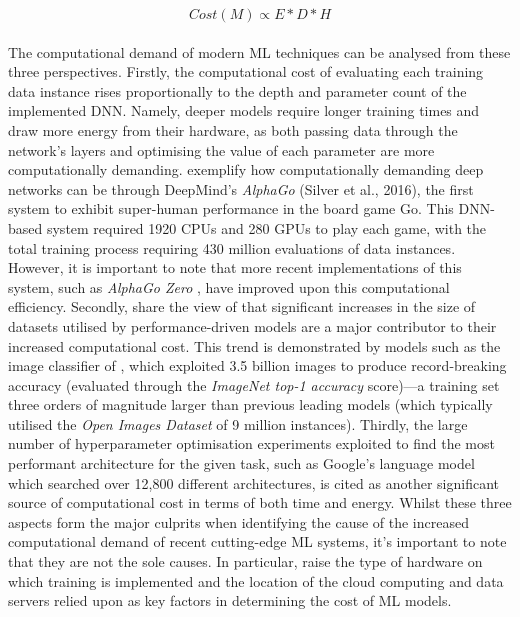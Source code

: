 \documentclass[a4paper, 12pt]{article}
\begin{document}
    \begin{equation}
        Cost(M) \propto E * D * H
        \label{eq:cost}
    \end{equation}
    \\
    The computational demand of modern ML techniques can be analysed from these three perspectives. Firstly, the computational cost of evaluating each training data instance rises proportionally to the depth and parameter count of the implemented DNN. Namely, deeper models require longer training times and draw more energy from their hardware, as both passing data through the network's layers and optimising the value of each parameter are more computationally demanding.  exemplify how computationally demanding deep networks can be through DeepMind's \emph{AlphaGo} (Silver et al., 2016), the first system to exhibit super-human performance in the board game Go. This DNN-based system required 1920 CPUs and 280 GPUs to play each game, with the total training process requiring 430 million evaluations of data instances. However, it is important to note that more recent implementations of this system, such as \emph{AlphaGo Zero} \cite{silver-2017}, have improved upon this computational efficiency. Secondly,  share the view of  that significant increases in the size of datasets utilised by performance-driven models are a major contributor to their increased computational cost. This trend is demonstrated by models such as the image classifier of , which exploited 3.5 billion images to produce record-breaking accuracy (evaluated through the \emph{ImageNet top-1 accuracy} score)---a training set three orders of magnitude larger than previous leading models (which typically utilised the \emph{Open Images Dataset} of 9 million instances). Thirdly, the large number of hyperparameter optimisation experiments exploited to find the most performant architecture for the given task, such as Google's language model \cite{cer-2018} which searched over 12,800 different architectures, is cited as another significant source of computational cost in terms of both time and energy. Whilst these three aspects form the major culprits when identifying the cause of the increased computational demand of recent cutting-edge ML systems, it's important to note that they are not the sole causes. In particular,  raise the type of hardware on which training is implemented and the location of the cloud computing and data servers relied upon as key factors in determining the cost of ML models.
\end{document}
